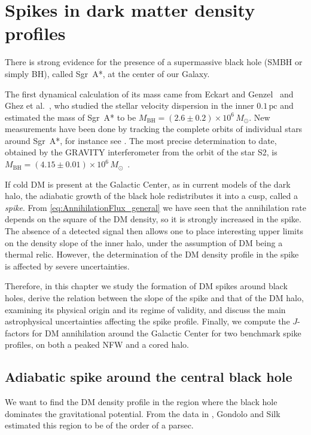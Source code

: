 \chapter{Spikes in dark matter density profiles} \label{chap:spikes}


There is strong evidence for the presence of a supermassive black hole (SMBH or simply BH), called Sgr~A*, at the center of our Galaxy.

The first dynamical calculation of its mass came from Eckart and Genzel~\cite{Eckart_1997} and Ghez et al.~\cite{Ghez_1998}, who studied the stellar velocity dispersion in the inner
$0.1\,\mathrm{pc}$ and estimated the mass of Sgr~A* to be $M_{\mathrm{BH}} = (2.6 \pm 0.2)\times 10^6\,M_\odot$.
New measurements have been done by tracking the complete orbits of individual stars around Sgr~A*, for instance see \cite{Ghez_2008,Gillessen_2009}.
The most precise determination to date, obtained by the GRAVITY interferometer from the orbit of the
star S2, is $M_{\mathrm{BH}} = (4.15 \pm 0.01)\times 10^6\,M_\odot$~\cite{GRAVITY_2019}.



If cold DM is present at the Galactic Center,
as in current models of the dark halo, the adiabatic growth of the black hole redistributes
it into a cusp, called a \emph{spike}.
From \cref{eq:AnnihilationFlux_general} we have seen that the annihilation rate depends on the square of
the DM density, so it is strongly increased in the spike. The absence of a detected signal then allows one to place interesting upper
limits on the density slope of the inner halo, under the assumption of DM being a thermal relic.
However, the determination of the DM density profile in the spike is affected by severe uncertainties.

Therefore, in this chapter we study the formation of DM spikes around black holes, derive the relation between the slope of the spike and that of the DM halo, examining its physical origin and its regime of validity, and discuss the main astrophysical uncertainties affecting the spike profile. 
Finally, we compute the $J$-factors for DM annihilation around the Galactic Center for two benchmark spike profiles, on both a peaked NFW and a cored halo.


\section{Adiabatic spike around the central black hole} \label{adiabatic_spike}

We want to find the DM density profile in the region
where the black hole dominates the gravitational
potential. From the data in \cite{Eckart_1997,Ghez_1998}, Gondolo and Silk \cite{Gondolo_1999} estimated this region to be of the order of a parsec.


